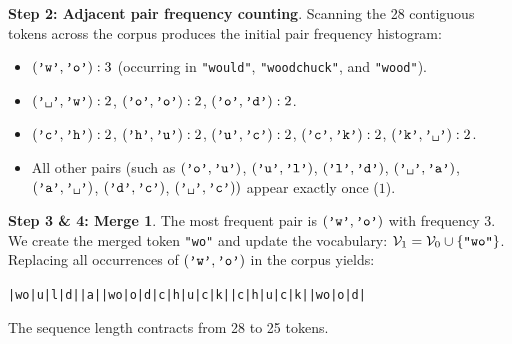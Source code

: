 \documentclass[../../main.tex]{subfiles}
\begin{document}
\noindent\textbf{Step 2: Adjacent pair frequency counting}.\newline
Scanning the 28 contiguous tokens across the corpus produces the initial pair frequency histogram:
\begin{itemize}
    \item $(\text{\texttt{'w'}}, \text{\texttt{'o'}}): 3$ (occurring in \texttt{"would"}, \texttt{"woodchuck"}, and \texttt{"wood"}).
    \item $(\text{\texttt{'\textvisiblespace{}'}}, \text{\texttt{'w'}}): 2$, \quad $(\text{\texttt{'o'}}, \text{\texttt{'o'}}): 2$, \quad $(\text{\texttt{'o'}}, \text{\texttt{'d'}}): 2$.
    \item $(\text{\texttt{'c'}}, \text{\texttt{'h'}}): 2$, \quad $(\text{\texttt{'h'}}, \text{\texttt{'u'}}): 2$, \quad $(\text{\texttt{'u'}}, \text{\texttt{'c'}}): 2$, \quad $(\text{\texttt{'c'}}, \text{\texttt{'k'}}): 2$, \quad $(\text{\texttt{'k'}}, \text{\texttt{'\textvisiblespace{}'}}): 2$.
    \item All other pairs (such as $(\text{\texttt{'o'}}, \text{\texttt{'u'}})$, $(\text{\texttt{'u'}}, \text{\texttt{'l'}})$, $(\text{\texttt{'l'}}, \text{\texttt{'d'}})$, $(\text{\texttt{'\textvisiblespace{}'}}, \text{\texttt{'a'}})$, $(\text{\texttt{'a'}}, \text{\texttt{'\textvisiblespace{}'}})$, $(\text{\texttt{'d'}}, \text{\texttt{'c'}})$, $(\text{\texttt{'\textvisiblespace{}'}}, \text{\texttt{'c'}}))$ appear exactly once ($1$).
\end{itemize}

\noindent\textbf{Step 3 \& 4: Merge 1}.\newline
The most frequent pair is $(\text{\texttt{'w'}}, \text{\texttt{'o'}})$ with frequency 3. We create the merged token \texttt{"wo"} and update the vocabulary: $\mathcal{V}_1 = \mathcal{V}_0 \cup \{\text{\texttt{"wo"}}\}$. Replacing all occurrences of $(\text{\texttt{'w'}}, \text{\texttt{'o'}})$ in the corpus yields:
\begin{center}
\texttt{|wo|u|l|d|\textvisiblespace{}|a|\textvisiblespace{}|wo|o|d|c|h|u|c|k|\textvisiblespace{}|c|h|u|c|k|\textvisiblespace{}|wo|o|d|}
\end{center}
The sequence length contracts from 28 to 25 tokens.
\end{document}
